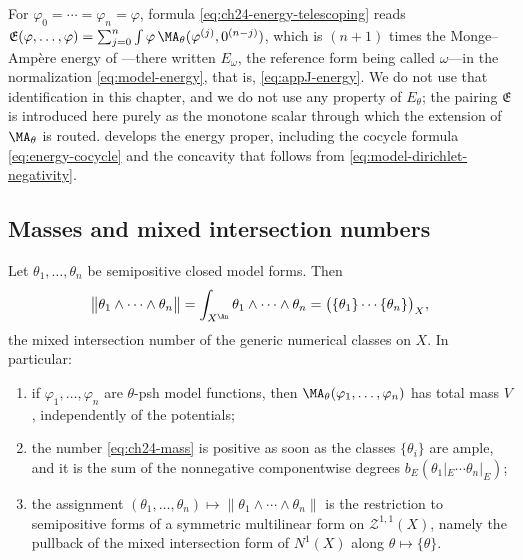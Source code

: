 \begin{remark}
\label{rem:ch24-energy-vs-E}
For $\varphi_0=\cdots=\varphi_n=\varphi$, formula
\eqref{eq:ch24-energy-telescoping} reads
$\mathfrak E(\varphi,\ldots,\varphi)
 =\sum_{j=0}^n\int\varphi\,
   \MA_\theta(\varphi^{(j)},0^{(n-j)})$,
which is $(n+1)$ times the Monge--Amp\`ere energy of
---there written $E_\omega$, the reference form
being called $\omega$---in the normalization
\eqref{eq:model-energy}, that is, \eqref{eq:appJ-energy}.  We do not use
that identification in this chapter,
and we do not use any property of $E_\theta$; the pairing
$\mathfrak E$ is introduced here purely as the monotone scalar through
which the extension of $\MA_\theta$ is routed.  
develops the energy proper, including the cocycle formula
\eqref{eq:energy-cocycle} and the concavity that follows from
\eqref{eq:model-dirichlet-negativity}.
\end{remark}

\subsection{Masses and mixed intersection numbers}
\label{sec:ch24-masses}

\begin{theorem}
\label{thm:ch24-mass}
Let $\theta_1,\ldots,\theta_n$ be semipositive closed model forms.  Then
\begin{equation}
\label{eq:ch24-mass}
 \bigl\|\theta_1\wedge\cdots\wedge\theta_n\bigr\|
 =\int_{X^{\An}}\theta_1\wedge\cdots\wedge\theta_n
 =\bigl(\{\theta_1\}\cdots\{\theta_n\}\bigr)_X ,
\end{equation}
the mixed intersection number of the generic numerical classes on $X$.  In
particular:
\begin{enumerate}
\item\label{itm:ch24-mass:psh} if $\varphi_1,\ldots,\varphi_n$ are
 $\theta$-psh model functions, then
 $\MA_\theta(\varphi_1,\ldots,\varphi_n)$ has total mass $V$,
 independently of the potentials;
\item\label{itm:ch24-mass:pos} the number \eqref{eq:ch24-mass} is positive
 as soon as the classes $\{\theta_i\}$ are ample, and it is the sum of the
 nonnegative componentwise degrees $b_E(\theta_1|_E\cdots\theta_n|_E)$;
\item\label{itm:ch24-mass:mixed} the assignment
 $(\theta_1,\ldots,\theta_n)\mapsto\|\theta_1\wedge\cdots\wedge\theta_n\|$
 is the restriction to semipositive forms of a symmetric multilinear form on
 $\mathcal Z^{1,1}(X)$, namely the pullback of the mixed intersection form
 of $N^1(X)$ along $\theta\mapsto\{\theta\}$.
\end{enumerate}
\end{theorem}

